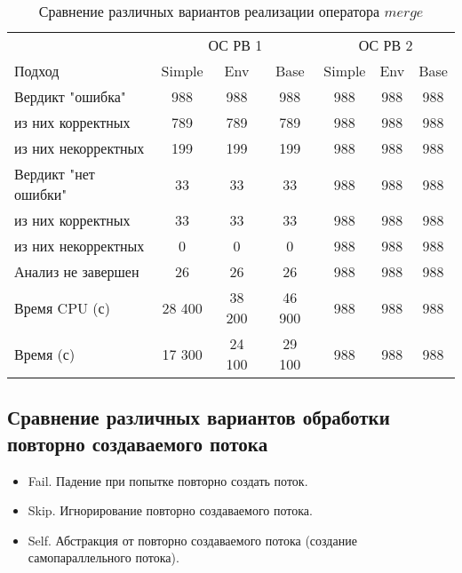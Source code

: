 \begin{center}
  \begin{table}[h]\footnotesize
  	\label{table-drivers-lock-merge}
    \caption{Сравнение различных вариантов реализации оператора $merge$}
    \begin{tabular}{ | l | c | c | c | c | c | c |}
      \hline
      		& 		\multicolumn{3}{|c|}{ОС РВ 1} & \multicolumn{3}{|c|}{ОС РВ 2} \\
      Подход         				& Simple 	& Env 	& Base 	& Simple 	& Env 	& Base 		\\ \hline
      Вердикт "ошибка" 				& 988    	& 988   & 988   & 988       & 988   & 988  		\\ 
  \hspace{0.5cm} из них корректных 	& 789 		& 789 	& 789   & 988       & 988   & 988  		\\ 
  \hspace{0.5cm} из них некорректных & 199 		& 199 	& 199   & 988       & 988   & 988  		\\ \hline
      Вердикт "нет ошибки"  		& 33      	& 33    & 33    & 988       & 988  	& 988  		\\ 
  \hspace{0.5cm} из них корректных 	& 33 		& 33    & 33    & 988       & 988   & 988   	\\
  \hspace{0.5cm} из них некорректных & 0 		& 0    	& 0     & 988       & 988   & 988   	\\ \hline
      Анализ не завершен       		& 26     	& 26    & 26    & 988       & 988   & 988    	\\ \hline
      Время CPU (с)   				& 28 400 	& 38 200 & 46 900 & 988     & 988   & 988   	\\ 
      Время (с)  					& 17 300 	& 24 100 & 29 100 & 988     & 988 	& 988    	\\
      \hline
    \end{tabular}
  \end{table}
\end{center}

\subsection{Сравнение различных вариантов обработки повторно создаваемого потока }

\begin{itemize}
\item Fail. Падение при попытке повторно создать поток.
\item Skip. Игнорирование повторно создаваемого потока.
\item Self. Абстракция от повторно создаваемого потока (создание самопараллельного потока).
\end{itemize}

